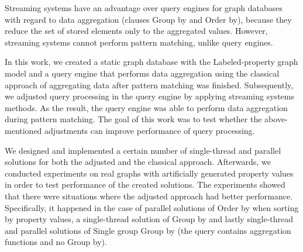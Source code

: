 \documentclass[12pt]{report}
\begin{document}

Streaming systems have an advantage over query engines for graph databases with regard to data aggregation (clauses Group by and Order by), because they reduce the set of stored elements only to the aggregated values.
However, streaming systems cannot perform pattern matching, unlike query engines.

In this work, we created a static graph database with the Labeled-property graph model and a query engine that performs data aggregation using the classical approach of aggregating data after pattern matching was finished.
Subsequently, we adjusted query processing in the query engine by applying streaming systems methods. 
As the result, the query engine was able to perform data aggregation during pattern matching.  
The goal of this work was to test whether the above-mentioned adjustments can improve performance of query processing.

We designed and implemented a certain number of single-thread and parallel solutions for both the adjusted and the classical approach.
Afterwards, we conducted experiments on real graphs with artificially generated property values in order to test performance of the created solutions.
The experiments showed that there were situations where the adjusted approach had better performance.
Specifically, it happened in the case of parallel solutions of Order by when sorting by property values, a single-thread solution of Group by and lastly single-thread and parallel solutions of Single group Group by (the query contains aggregation functions and no Group by).
\end{document}
